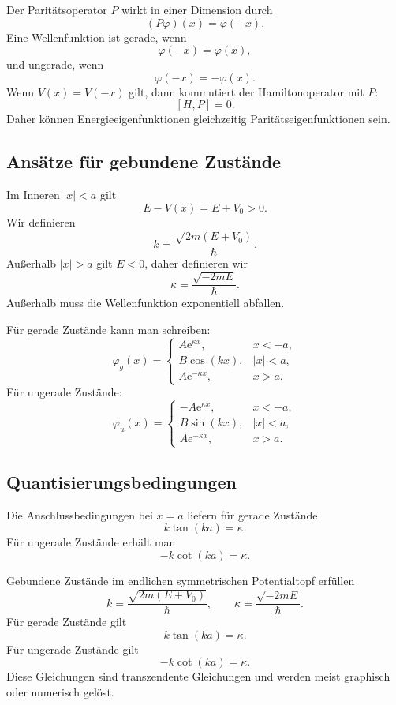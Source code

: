 \begin{definitionbox}
Der Paritätsoperator $P$ wirkt in einer Dimension durch
\[
    (P\varphi)(x)=\varphi(-x).
\]
Eine Wellenfunktion ist gerade, wenn
\[
    \varphi(-x)=\varphi(x),
\]
und ungerade, wenn
\[
    \varphi(-x)=-\varphi(x).
\]
Wenn $V(x)=V(-x)$ gilt, dann kommutiert der Hamiltonoperator mit $P$:
\[
    [H,P]=0.
\]
Daher können Energieeigenfunktionen gleichzeitig Paritätseigenfunktionen sein.
\end{definitionbox}

\subsection{Ansätze für gebundene Zustände}

Im Inneren $|x|<a$ gilt
\[
    E-V(x)=E+V_0>0.
\]
Wir definieren
\[
    k=\frac{\sqrt{2m(E+V_0)}}{\hbar}.
\]
Außerhalb $|x|>a$ gilt $E<0$, daher definieren wir
\[
    \kappa=\frac{\sqrt{-2mE}}{\hbar}.
\]
Außerhalb muss die Wellenfunktion exponentiell abfallen.

Für gerade Zustände kann man schreiben:
\[
    \varphi_g(x)=
    \begin{cases}
        A\mathrm{e}^{\kappa x}, & x<-a,\\
        B\cos(kx), & |x|<a,\\
        A\mathrm{e}^{-\kappa x}, & x>a.
    \end{cases}
\]
Für ungerade Zustände:
\[
    \varphi_u(x)=
    \begin{cases}
        -A\mathrm{e}^{\kappa x}, & x<-a,\\
        B\sin(kx), & |x|<a,\\
        A\mathrm{e}^{-\kappa x}, & x>a.
    \end{cases}
\]

\subsection{Quantisierungsbedingungen}

Die Anschlussbedingungen bei $x=a$ liefern für gerade Zustände
\[
    k\tan(ka)=\kappa.
\]
Für ungerade Zustände erhält man
\[
    -k\cot(ka)=\kappa.
\]

\begin{formulabox}
Gebundene Zustände im endlichen symmetrischen Potentialtopf erfüllen
\[
    k=\frac{\sqrt{2m(E+V_0)}}{\hbar},
    \qquad
    \kappa=\frac{\sqrt{-2mE}}{\hbar}.
\]
Für gerade Zustände gilt
\[
    k\tan(ka)=\kappa.
\]
Für ungerade Zustände gilt
\[
    -k\cot(ka)=\kappa.
\]
Diese Gleichungen sind transzendente Gleichungen und werden meist graphisch oder numerisch gelöst.
\end{formulabox}

